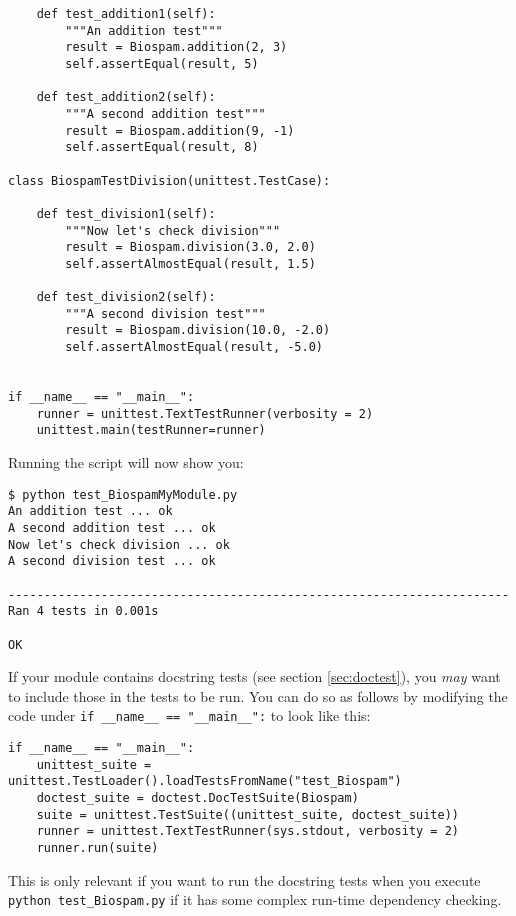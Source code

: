 \begin{itemize}
\begin{verbatim}
    def test_addition1(self):
        """An addition test"""
        result = Biospam.addition(2, 3)
        self.assertEqual(result, 5)

    def test_addition2(self):
        """A second addition test"""
        result = Biospam.addition(9, -1)
        self.assertEqual(result, 8)

class BiospamTestDivision(unittest.TestCase):

    def test_division1(self):
        """Now let's check division"""
        result = Biospam.division(3.0, 2.0)
        self.assertAlmostEqual(result, 1.5)

    def test_division2(self):
        """A second division test"""
        result = Biospam.division(10.0, -2.0)
        self.assertAlmostEqual(result, -5.0)


if __name__ == "__main__":
    runner = unittest.TextTestRunner(verbosity = 2)
    unittest.main(testRunner=runner)
\end{verbatim}

        Running the script will now show you:

\begin{verbatim}
$ python test_BiospamMyModule.py
An addition test ... ok
A second addition test ... ok
Now let's check division ... ok
A second division test ... ok

----------------------------------------------------------------------
Ran 4 tests in 0.001s

OK
\end{verbatim}
\end{itemize}

If your module contains docstring tests (see section \ref{sec:doctest}),
you \emph{may} want to include those in the tests to be run. You can do so as
follows by modifying the code under \verb|if __name__ == "__main__":|
to look like this:

\begin{verbatim}
if __name__ == "__main__":
    unittest_suite = unittest.TestLoader().loadTestsFromName("test_Biospam")
    doctest_suite = doctest.DocTestSuite(Biospam)
    suite = unittest.TestSuite((unittest_suite, doctest_suite))
    runner = unittest.TextTestRunner(sys.stdout, verbosity = 2)
    runner.run(suite)
\end{verbatim}

This is only relevant if you want to run the docstring tests when you
execute \verb|python test_Biospam.py| if it has some complex run-time
dependency checking.

